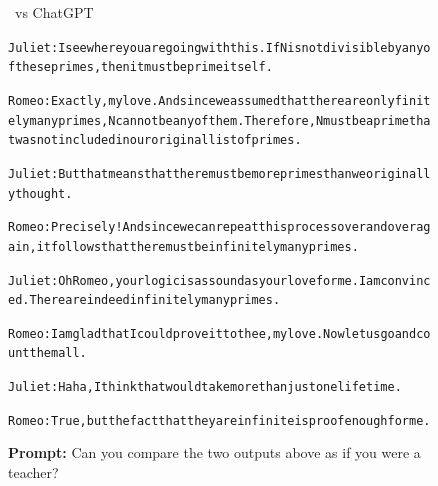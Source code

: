 \begin{figure}[H]
\begin{AIbox}{\DV \ vs ChatGPT}
{\begin{alltt}
Juliet: I see where you are going with this. If N is not divisible by any of these primes, then it must be prime itself.\\\vspace{-3px}

Romeo: Exactly, my love. And since we assumed that there are only finitely many primes, N cannot be any of them. Therefore, N must be a prime that was not included in our original list of primes.\\\vspace{-3px}

Juliet: But that means that there must be more primes than we originally thought.\\\vspace{-3px}

Romeo: Precisely! And since we can repeat this process over and over again, it follows that there must be infinitely many primes.\\\vspace{-3px}

Juliet: Oh Romeo, your logic is as sound as your love for me. I am convinced. There are indeed infinitely many primes.\\\vspace{-3px}

Romeo: I am glad that I could prove it to thee, my love. Now let us go and count them all.\\\vspace{-3px}

Juliet: Haha, I think that would take more than just one lifetime.\\\vspace{-3px}

Romeo: True, but the fact that they are infinite is proof enough for me.\end{alltt}}

\tcbline
{\bf Prompt:} Can you compare the two outputs above as if you were a teacher?\\


\end{AIbox}
\end{figure}
